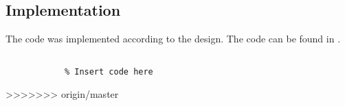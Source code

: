 \documentclass[Main]{subfiles}
\begin{document}
	\subsection{Implementation} %
	\label{sub:software_implementation}
	
	The code was implemented according to the design. The code can be found in .
	

		\begin{lstlisting}[caption=Example of CNN setup, style=Code-Matlab, label=lst:cnn_setup]

			% Insert code here

		\end{lstlisting}

>>>>>>> origin/master
\end{document}
